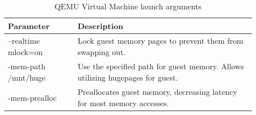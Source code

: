 \begin{table}
    \centering
    \caption{QEMU Virtual Machine launch arguments}
    \label{tab:qemu_params_table}
\begin{tabular}{|l|p{10cm}|}
\hline
Parameter & Description \\
\hline \hline
--realtime mlock=on & Lock guest memory pages to prevent them from swapping out.\\ 
\hline
-mem-path /mnt/huge & Use the specified path for guest memory.  Allows utilizing hugepages for guest.\\
\hline
-mem-prealloc & Preallocates guest memory, decreasing latency for most memory accesses.\\
\hline
\end{tabular}
\end{table}

